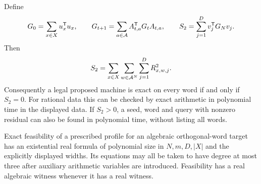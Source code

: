 \begin{theorem}\label{thm:gram46}
Define
\begin{equation}\label{eq:gram46}
 G_0=\sum_{x\in X}u_x^{\mathsf T}u_x,\qquad
 G_{t+1}=\sum_{a\in\mathcal A}A_{t,a}^{\mathsf T}G_tA_{t,a},\qquad
 S_2=\sum_{j=1}^D v_j^{\mathsf T}G_Nv_j.
\end{equation}
Then
\[
 S_2=\sum_{x\in X}\sum_{w\in\mathcal A^N}\sum_{j=1}^D R_{x,w,j}^2.
\]
Consequently a legal proposed machine is exact on every word if and
only if $S_2=0$. For rational data this can be checked by exact
arithmetic in polynomial time in the displayed data. If $S_2>0$, a
seed, word and query with nonzero residual can also be found in
polynomial time, without listing all words.

Exact feasibility of a prescribed profile for an algebraic
orthogonal-word target has an existential real formula of polynomial
size in $N,m,D,|X|$ and the explicitly displayed widths. Its equations
may all be taken to have degree at most three after auxiliary arithmetic
variables are introduced. Feasibility has a real algebraic witness
whenever it has a real witness.
\end{theorem}
